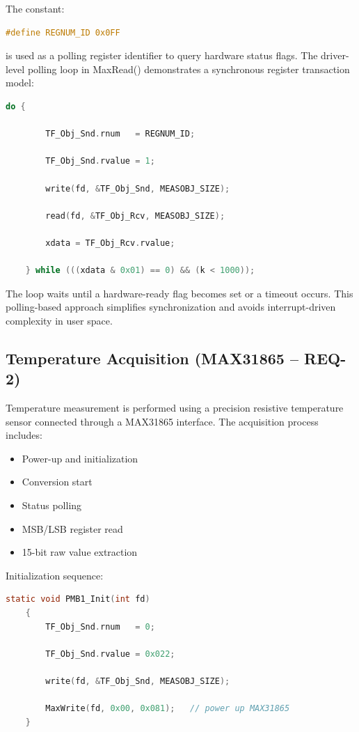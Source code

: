 The constant:

\begin{lstlisting}[language=C]
	#define REGNUM_ID 0x0FF
\end{lstlisting}

is used as a polling register identifier to query hardware status flags. The driver-level polling loop in MaxRead() demonstrates a synchronous register transaction model:

\begin{lstlisting}[language=C]
	do {
		
		TF_Obj_Snd.rnum   = REGNUM_ID;
		
		TF_Obj_Snd.rvalue = 1;
		
		write(fd, &TF_Obj_Snd, MEASOBJ_SIZE);
		
		read(fd, &TF_Obj_Rcv, MEASOBJ_SIZE);
		
		xdata = TF_Obj_Rcv.rvalue;
		
	} while (((xdata & 0x01) == 0) && (k < 1000));
\end{lstlisting}

The loop waits until a hardware-ready flag becomes set or a timeout occurs. This polling-based approach simplifies synchronization and avoids interrupt-driven complexity in user space.

\subsection{Temperature Acquisition (MAX31865 – REQ-2)}

Temperature measurement is performed using a precision resistive temperature sensor connected through a MAX31865 interface. The acquisition process includes:

\begin{itemize}
	\item Power-up and initialization
	\item Conversion start
	\item Status polling
	\item MSB/LSB register read
	\item 15-bit raw value extraction
\end{itemize}

Initialization sequence:

\begin{lstlisting}[language=C]
	static void PMB1_Init(int fd)
	{
		TF_Obj_Snd.rnum   = 0;
		
		TF_Obj_Snd.rvalue = 0x022;
		
		write(fd, &TF_Obj_Snd, MEASOBJ_SIZE);
		
		MaxWrite(fd, 0x00, 0x081);   // power up MAX31865
	}
\end{lstlisting}

